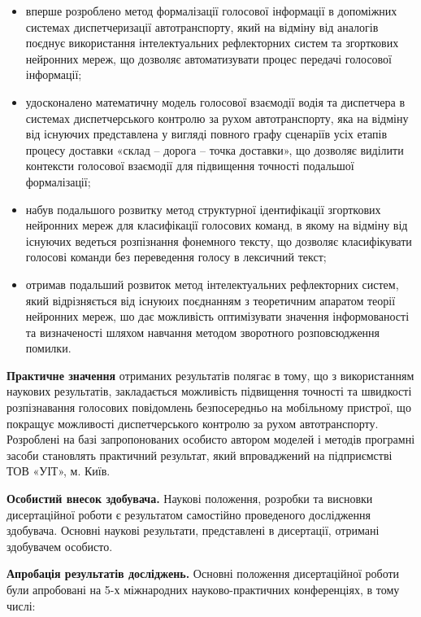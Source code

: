 \begin{itemize}
	\item вперше розроблено метод формалізації голосової інформації в допоміжних системах диспетчеризації автотранспорту, який на відміну від аналогів поєднує використання інтелектуальних рефлекторних систем та згорткових нейронних мереж, що дозволяє автоматизувати процес передачі голосової інформації;
	\item удосконалено математичну модель голосової взаємодії водія та диспетчера в системах диспетчерського контролю за рухом автотранспорту, яка на відміну від існуючих представлена у вигляді повного графу сценаріїв усіх етапів процесу доставки «склад – дорога – точка доставки», що дозволяє виділити контексти голосової взаємодії для підвищення точності подальшої формалізації;
	\item набув подальшого розвитку метод структурної ідентифікації згорткових нейронних мереж для класифікації голосових команд, в якому на відміну від існуючих ведеться розпізнання фонемного тексту, що дозволяє класифікувати голосові команди без переведення голосу в лексичний текст;
	\item отримав подальший розвиток метод інтелектуальних рефлекторних систем, який відрізняється від існуюих поєднанням з теоретичним апаратом теорії нейронних мереж, шо дає можливість оптимізувати значення інформованості та визначеності шляхом навчання методом зворотного розповсюдження помилки.
\end{itemize}

\textbf{Практичне значення} отриманих результатів полягає в тому, що з використанням наукових результатів, закладається можливість підвищення точності та швидкості розпізнавання голосових повідомлень безпосередньо на мобільному пристрої, що покращує можливості диспетчерського контролю за рухом автотранспорту. Розроблені на базі запропонованих особисто автором моделей і методів програмні засоби становлять практичний результат, який впроваджений на підприємстві ТОВ «УІТ», м. Київ.

\textbf{Особистий внесок здобувача.} Наукові положення, розробки та висновки дисертаційної роботи є результатом самостійно проведеного дослідження здобувача. Основні наукові результати, представлені в дисертації, отримані здобувачем особисто.

\textbf{Апробація результатів досліджень.} Основні положення дисертаційної роботи були апробовані на 5-х міжнародних науково-практичних конференціях, в тому числі:

